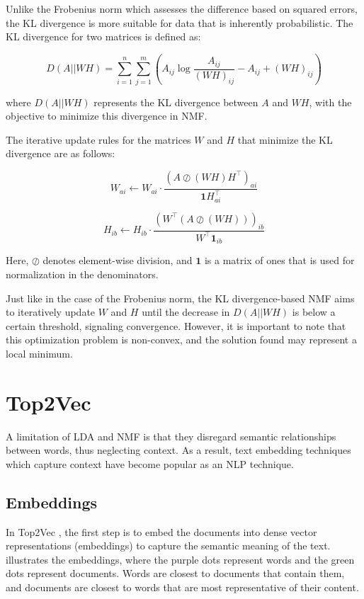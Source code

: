 Unlike the Frobenius norm which assesses the difference based on squared errors, the KL divergence is more suitable for data that is inherently probabilistic. The KL divergence for two matrices is defined as:

\[
    D(A || WH) = \sum_{i=1}^{n} \sum_{j=1}^{m} \left( A_{ij} \log\frac{A_{ij}}{(WH)_{ij}} - A_{ij} + (WH)_{ij} \right)
\]

where \( D(A || WH) \) represents the KL divergence between \( A \) and \( WH \), with the objective to minimize this divergence in NMF.

The iterative update rules for the matrices \( W \) and \( H \) that minimize the KL divergence are as follows:

\[
    W_{ai} \leftarrow W_{ai} \cdot \frac{(A \oslash (WH)H^\top)_{ai}}{\mathbf{1}H^\top_{ai}}
\]

\[
    H_{ib} \leftarrow H_{ib} \cdot \frac{(W^\top(A \oslash (WH)))_{ib}}{W^\top\mathbf{1}_{ib}}
\]

Here, \( \oslash \) denotes element-wise division, and \( \mathbf{1} \) is a matrix of ones that is used for normalization in the denominators.

Just like in the case of the Frobenius norm, the KL divergence-based NMF aims to iteratively update \( W \) and \( H \) until the decrease in \( D(A || WH) \) is below a certain threshold, signaling convergence. However, it is important to note that this optimization problem is non-convex, and the solution found may represent a local minimum.

\section{Top2Vec}
A limitation of LDA and NMF is that they disregard semantic relationships between words, thus neglecting context. As a result, text embedding techniques which capture context have become popular as an NLP technique.

\subsection{Embeddings}

In Top2Vec \cite{angelov_top2vec_2020}, the first step is to embed the documents into dense vector representations (embeddings) to capture the semantic meaning of the text.  \cite{angelov_top2vec_2020} illustrates the embeddings, where the purple dots represent words and the green dots represent documents. Words are closest to documents that contain them, and documents are closest to words that are most representative of their content.

